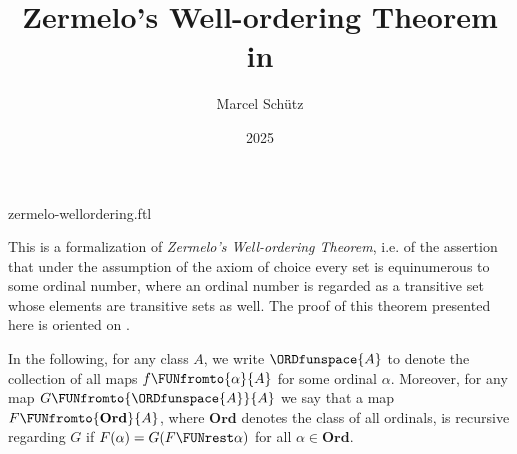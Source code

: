 \documentclass{stex}
\title{Zermelo's Well-ordering Theorem in \Naproche}
\author{Marcel Schütz}
\date{2025}
\newcommand\Ord{\textbf{Ord}}
\begin{document}
\begin{smodule}{zermelo-wellordering.ftl}
\maketitle



\noindent This is a formalization of \textit{Zermelo's Well-ordering Theorem},
i.e. of the assertion that under the assumption of the axiom of choice every
set is equinumerous to some ordinal number, where an ordinal number is
regarded as a transitive set whose elements are transitive sets as well.
The proof of this theorem presented here is oriented on \cite{Koepke2018}.

In the following, for any class $A$, we write $\ORDfunspace{A}$ to
denote the collection of all maps $f \FUNfromto{\alpha}{A}$ for some ordinal
$\alpha$.
Moreover, for any map $G \FUNfromto{\ORDfunspace{A}}{A}$ we say that a map
$F \FUNfromto{\Ord}{A}$, where $\Ord$ denotes the class of all ordinals, is
recursive regarding $G$ if $F(\alpha) = G(F \FUNrest \alpha)$ for all
$\alpha \in \Ord$.


\end{smodule}
\end{document}
